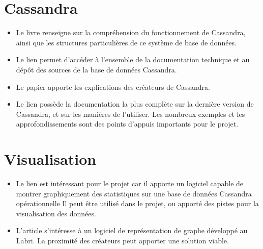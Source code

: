 \documentclass[12 pt]{article}
\begin{document}
\section{Cassandra}

\begin{itemize}
\item Le livre \cite{Hewitt2010} renseigne sur la compréhension du fonctionnement de Cassandra, ainsi que les structures particulières de ce système de base de données.

\item Le lien \cite{ApacheCassandra09} permet d'accéder à l'ensemble de la documentation technique et au dépôt des sources de la base de données Cassandra.

\item Le papier \cite{FacebookCassandra09} apporte les explications des créateurs de Cassandra.

\item Le lien \cite{DSDocCassandra15} possède la documentation la plus complète sur la dernière version de Cassandra, et sur les manières de l'utiliser.
Les nombreux exemples et les approfondissements sont des points d'appuis importants pour le projet.

\end{itemize}

\section{Visualisation}

\begin{itemize}
\item Le lien \cite{DSOpsCenter14} est intéressant pour le projet car il apporte un logiciel capable de montrer graphiquement des statistiques sur une base de données Cassandra opérationnelle
Il peut être utilisé dans le projet, ou apporté des pistes pour la visualisation des données.

\item L'article \cite{Tulip12} s'intéresse à un logiciel de représentation de graphe développé au Labri.
La proximité des créateurs peut apporter une solution viable.
\end{itemize} 


\end{document}
